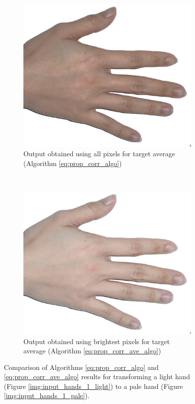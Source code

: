 \begin{figure}[H]
    \centering
    \begin{subfigure}[b]{0.40\textwidth}
        \includegraphics[width=\textwidth]{../rc_test/outputs/20170522_proportional_corrected_test_alpha1p1/hand_light_to_hand_pale.jpg}
        \caption{Output obtained using all pixels for target average (Algorithm \ref{eq:prop_corr_algo})}
    \end{subfigure}
    ~
    \begin{subfigure}[b]{0.40\textwidth}
        \includegraphics[width=\textwidth]{../rc_test/outputs/20170524_prop_corr_1p1_ave_10/hand_light_to_hand_pale.jpg}
        \caption{Output obtained using brightest pixels for target average (Algorithm \ref{eq:prop_corr_ave_algo})}
    \end{subfigure}
    \caption{Comparison of Algorithms \ref{eq:prop_corr_algo} and \ref{eq:prop_corr_ave_algo} results for transforming a light hand (Figure \ref{img:input_hands_1_light}) to a pale hand (Figure \ref{img:input_hands_1_pale}).\label{img:compare_perc}}
\end{figure}

